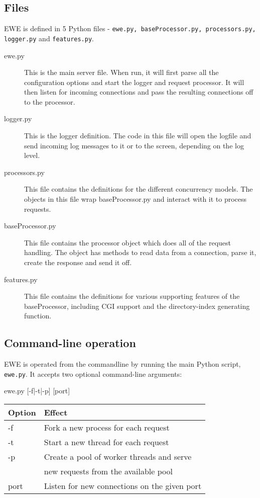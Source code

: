 \documentclass{article}
\begin{document}
\subsection{Files}
EWE is defined in 5 Python files - \texttt{ewe.py, baseProcessor.py, processors.py, logger.py} and \texttt{features.py}.
\begin{description}
\item[ewe.py] This is the main server file.
When run, it will first parse all the configuration options and start the logger and request processor.
It will then listen for incoming connections and pass the resulting connections off to the processor.
\item[logger.py] This is the logger definition.
The code in this file will open the logfile and send incoming log messages to it or to the screen, depending on the log level.
\item[processors.py] This file contains the definitions for the different concurrency models.
The objects in this file wrap baseProcessor.py and interact with it to process requests.
\item[baseProcessor.py] This file contains the processor object which does all of the request handling.
The object has methods to read data from a connection, parse it, create the response and send it off.
\item[features.py] This file contains the definitions for various supporting features of the baseProcessor, including CGI support and the directory-index generating function.
\end{description}

\subsection{Command-line operation}
EWE is operated from the commandline by running the main Python script, \texttt{ewe.py}.
It accepts two optional command-line arguments:

\parbox{3in}{\centering ewe.py [-f|-t|-p] [port]}

\begin{tabular}{|l|l|}
\hline
Option & Effect \\
\hline
-f & Fork a new process for each request \\
-t & Start a new thread for each request \\
-p & Create a pool of worker threads and serve\\
   & new requests from the available pool \\
\hline
port & Listen for new connections on the given port \\
\hline
\end{tabular}
\end{document}
